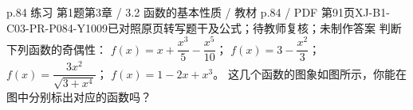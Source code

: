 \par\noindent\begin{minipage}{\linewidth}
\begin{bankitem}{p.84 练习 第1题}{第3章 / 3.2 函数的基本性质 / 教材 p.84 / PDF 第91页}{XJ-B1-C03-PR-P084-Y1009}{已对照原页转写题干及公式；待教师复核；未制作答案}
判断下列函数的奇偶性：
$f(x)=x+\dfrac{x^3}5-\dfrac{x^5}{10}$；
$f(x)=3-\dfrac{x^2}3$；
$f(x)=\dfrac{3x^2}{\sqrt{3+x^4}}$；
$f(x)=1-2x+x^3$。
这几个函数的图象如图所示，你能在图中分别标出对应的函数吗？
\end{bankitem}
\end{minipage}\par\medskip
